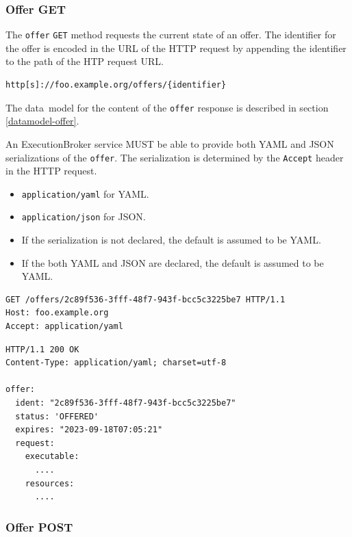\documentclass[11pt,a4paper]{ivoa}
\newcommand{\json} {JSON}
\newcommand{\yaml} {YAML}
\newcommand{\datamodel} {data~model}
\newcommand{\execbrokerclass} {ExecutionBroker}
\newcommand{\codeword}[1] {\texttt{#1}}
\begin{document}
\subsubsection{Offer GET}
\label{execution-planner-offer-get}

The \codeword{offer} \codeword{GET} method requests the current state of an offer.
The identifier for the offer is encoded in the URL of the HTTP request by appending the
identifier to the path of the HTP request URL.

\begin{lstlisting}[]
http[s]://foo.example.org/offers/{identifier}
\end{lstlisting}

The \datamodel{} for the content of the \codeword{offer} response is described in section
\ref{datamodel-offer}.

An \execbrokerclass{} service MUST be able to provide both \yaml{} and \json{} serializations
of the \codeword{offer}.
The serialization is determined by the \codeword{Accept} header in the HTTP request.
\begin{itemize}
    \item \codeword{application/yaml} for \yaml{}.
    \item \codeword{application/json} for \json.
    \item If the serialization is not declared, the default is assumed to be \yaml{}.
    \item If the both \yaml{} and \json{} are declared, the default is assumed to be \yaml{}.
\end{itemize}

\begin{lstlisting}[]
GET /offers/2c89f536-3fff-48f7-943f-bcc5c3225be7 HTTP/1.1
Host: foo.example.org
Accept: application/yaml
\end{lstlisting}

\begin{lstlisting}[]
HTTP/1.1 200 OK
Content-Type: application/yaml; charset=utf-8

offer:
  ident: "2c89f536-3fff-48f7-943f-bcc5c3225be7"
  status: 'OFFERED'
  expires: "2023-09-18T07:05:21"
  request:
    executable:
      ....
    resources:
      ....
\end{lstlisting}

\subsubsection{Offer POST}
\label{execution-planner-offer-post}
\end{document}
